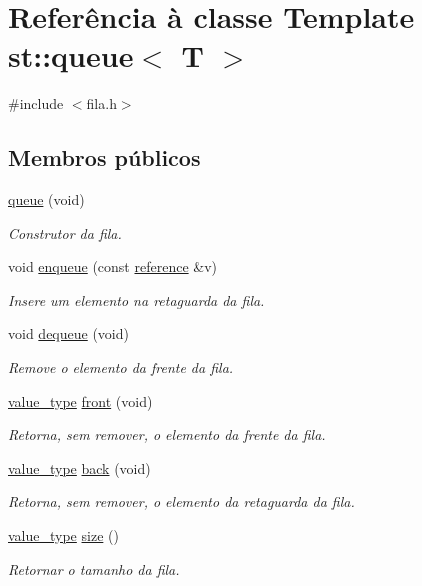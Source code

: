 \hypertarget{classst_1_1queue}{}\section{Referência à classe Template st\+:\+:queue$<$ T $>$}
\label{classst_1_1queue}


{\ttfamily \#include $<$fila.\+h$>$}

\subsection*{Membros públicos}
\begin{DoxyCompactItemize}
\item 
\hyperlink{classst_1_1queue_a7f06fb829d7ac4a8d6bd1a0dcb13749a}{queue} (void)
\begin{DoxyCompactList}\small\item\em Construtor da fila. \end{DoxyCompactList}\item 
void \hyperlink{classst_1_1queue_aa2c66e1680b02c2046f3c9ce5c9b9615}{enqueue} (const \hyperlink{classst_1_1queue_a826b47eddf0309ac74beca2f3d1e7b1c}{reference} \&v)
\begin{DoxyCompactList}\small\item\em Insere um elemento na retaguarda da fila. \end{DoxyCompactList}\item 
void \hyperlink{classst_1_1queue_a5d495f353753608cd37833d79c4f297e}{dequeue} (void)
\begin{DoxyCompactList}\small\item\em Remove o elemento da frente da fila. \end{DoxyCompactList}\item 
\hyperlink{classst_1_1queue_a2a0fa1d9b72bfdad9acf67a92146b143}{value\+\_\+type} \hyperlink{classst_1_1queue_a3d01a0be47bf5d5a8c011423cf36baf6}{front} (void)
\begin{DoxyCompactList}\small\item\em Retorna, sem remover, o elemento da frente da fila. \end{DoxyCompactList}\item 
\hyperlink{classst_1_1queue_a2a0fa1d9b72bfdad9acf67a92146b143}{value\+\_\+type} \hyperlink{classst_1_1queue_a84bb56aa5f5cecc6a42cac6977cc97c1}{back} (void)
\begin{DoxyCompactList}\small\item\em Retorna, sem remover, o elemento da retaguarda da fila. \end{DoxyCompactList}\item 
\hyperlink{classst_1_1queue_a2a0fa1d9b72bfdad9acf67a92146b143}{value\+\_\+type} \hyperlink{classst_1_1queue_a1b689674da153552513628f5347b5152}{size} ()
\begin{DoxyCompactList}\small\item\em Retornar o tamanho da fila. \end{DoxyCompactList}\end{DoxyCompactItemize}
